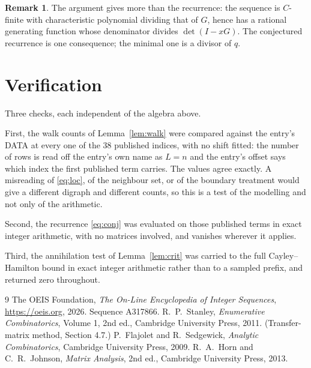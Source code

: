 \documentclass[11pt,a4paper]{article}
\theoremstyle{plain}
\theoremstyle{definition}
\newtheorem{remark}[theorem]{Remark}
\begin{document}
\begin{remark}
The argument gives more than the recurrence: the sequence is $C$-finite with characteristic
polynomial dividing that of $G$, hence has a rational generating function whose denominator
divides $\det(I-xG)$. The conjectured recurrence is one consequence; the minimal one is a
divisor of $q$.
\end{remark}

\section{Verification}

Three checks, each independent of the algebra above.

First, the walk counts of Lemma~\ref{lem:walk} were compared against the entry's DATA at
every one of the $38$ published indices, with no shift fitted: the number of rows is
read off the entry's own name as $L=n$ and the entry's offset says which index the first
published term carries. The values agree exactly. A misreading of \eqref{eq:loc}, of the
neighbour set, or of the boundary treatment would give a different digraph and different
counts, so this is a test of the modelling and not only of the arithmetic.

Second, the recurrence \eqref{eq:conj} was evaluated on those published terms in exact
integer arithmetic, with no matrices involved, and vanishes wherever it applies.

Third, the annihilation test of Lemma~\ref{lem:crit} was carried to the full
Cayley--Hamilton bound in exact integer arithmetic rather than to a sampled prefix, and
returned zero throughout.

\begin{thebibliography}{9}
 The OEIS Foundation, \emph{The On-Line Encyclopedia of Integer
Sequences}, \url{https://oeis.org}, 2026. Sequence A317866.
 R.~P.~Stanley, \emph{Enumerative Combinatorics}, Volume 1, 2nd ed.,
Cambridge University Press, 2011. (Transfer-matrix method, Section 4.7.)
 P.~Flajolet and R.~Sedgewick, \emph{Analytic Combinatorics}, Cambridge
University Press, 2009.
 R.~A.~Horn and C.~R.~Johnson, \emph{Matrix Analysis}, 2nd ed., Cambridge
University Press, 2013.
\end{thebibliography}
\end{document}
